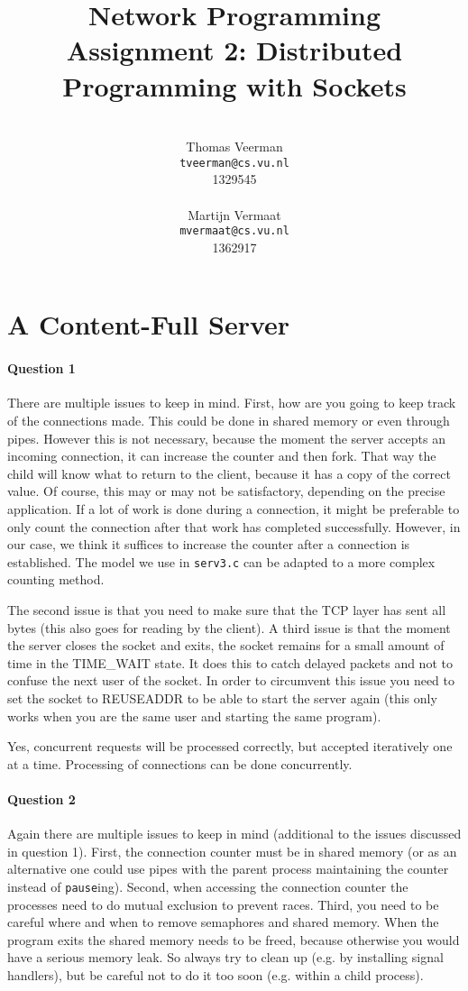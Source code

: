 \documentclass[a4paper,10pt]{article}
\title{Network Programming\\
\small{Assignment 2: Distributed Programming with Sockets}}
\author{%
        \mbox{}\\
        Thomas Veerman\\
        \texttt{tveerman@cs.vu.nl}\\
        1329545\\
        \mbox{}\\
        Martijn Vermaat\\
        \texttt{mvermaat@cs.vu.nl}\\
        1362917
}
\begin{document}
\maketitle

\section{A Content-Full Server}
\paragraph{Question 1}
There are multiple issues to keep in mind. First, how are you going to keep track of the
connections made. This could be done in shared memory or even through pipes. However
this is not necessary, because the moment the server accepts an incoming connection, it
can increase the counter and then fork. That way the child will know what to return to
the client, because it has a copy of the correct value. Of course, this may or may not
be satisfactory, depending on the precise application. If a lot of work is done during a
connection, it might be preferable to only count the connection after that work has
completed successfully. However, in our case, we think it suffices to increase the
counter after a connection is established. The model we use in \texttt{serv3.c} can be
adapted to a more complex counting method.

The second issue is that you
need to make sure that the TCP layer has sent all bytes (this also goes for reading by
the client). A third issue is that the moment the server closes the socket and exits,
the socket remains for a small amount of time in the TIME\_WAIT state. It does this to
catch delayed packets and not to confuse the next user of the socket. In order to
circumvent this issue you need to set the socket to REUSEADDR to be able to start the
server again (this only works when you are the same user and starting the same program).

Yes, concurrent requests will be processed correctly, but accepted iteratively one at a
time. Processing of connections can be done concurrently.

\paragraph{Question 2}
Again there are multiple issues to keep in mind (additional to the issues discussed in question 1). First, the connection counter must be in shared memory (or as an alternative one could use pipes with the parent process maintaining the counter instead of \texttt{pause}ing). Second, when accessing the connection counter the processes need to do mutual exclusion to prevent races. Third, you need to be careful where and when to remove semaphores and shared memory. When the program exits the shared memory needs to be freed, because otherwise you would have a serious memory leak. So always try to clean up (e.g. by installing signal handlers), but be careful not to do it too soon (e.g. within a child process).
\end{document}
